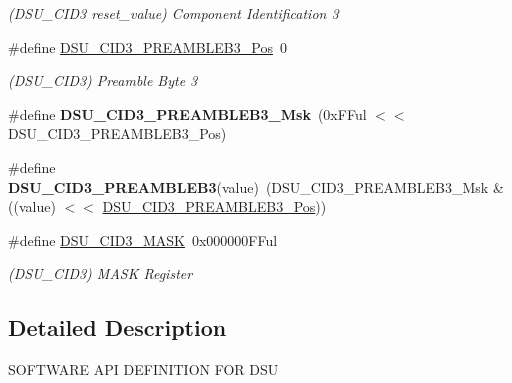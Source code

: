 \begin{DoxyCompactItemize}
\begin{DoxyCompactList}\small\item\em (D\+S\+U\+\_\+\+C\+I\+D3 reset\+\_\+value) Component Identification 3 \end{DoxyCompactList}\item 
\hypertarget{group___s_a_m_l21___d_s_u_gad11a14455b5f888c07616d9c56808b09}{}\#define \hyperlink{group___s_a_m_l21___d_s_u_gad11a14455b5f888c07616d9c56808b09}{D\+S\+U\+\_\+\+C\+I\+D3\+\_\+\+P\+R\+E\+A\+M\+B\+L\+E\+B3\+\_\+\+Pos}~0\label{group___s_a_m_l21___d_s_u_gad11a14455b5f888c07616d9c56808b09}

\begin{DoxyCompactList}\small\item\em (D\+S\+U\+\_\+\+C\+I\+D3) Preamble Byte 3 \end{DoxyCompactList}\item 
\hypertarget{group___s_a_m_l21___d_s_u_ga371986d5abba79b7e4389d750150cad1}{}\#define {\bfseries D\+S\+U\+\_\+\+C\+I\+D3\+\_\+\+P\+R\+E\+A\+M\+B\+L\+E\+B3\+\_\+\+Msk}~(0x\+F\+Ful $<$$<$ D\+S\+U\+\_\+\+C\+I\+D3\+\_\+\+P\+R\+E\+A\+M\+B\+L\+E\+B3\+\_\+\+Pos)\label{group___s_a_m_l21___d_s_u_ga371986d5abba79b7e4389d750150cad1}

\item 
\hypertarget{group___s_a_m_l21___d_s_u_gaa750f726cef165ba74dd6469057fa7d9}{}\#define {\bfseries D\+S\+U\+\_\+\+C\+I\+D3\+\_\+\+P\+R\+E\+A\+M\+B\+L\+E\+B3}(value)~(D\+S\+U\+\_\+\+C\+I\+D3\+\_\+\+P\+R\+E\+A\+M\+B\+L\+E\+B3\+\_\+\+Msk \& ((value) $<$$<$ \hyperlink{group___s_a_m_l21___d_s_u_gad11a14455b5f888c07616d9c56808b09}{D\+S\+U\+\_\+\+C\+I\+D3\+\_\+\+P\+R\+E\+A\+M\+B\+L\+E\+B3\+\_\+\+Pos}))\label{group___s_a_m_l21___d_s_u_gaa750f726cef165ba74dd6469057fa7d9}

\item 
\hypertarget{group___s_a_m_l21___d_s_u_ga7b551efb4b690585f91a21e36b24215f}{}\#define \hyperlink{group___s_a_m_l21___d_s_u_ga7b551efb4b690585f91a21e36b24215f}{D\+S\+U\+\_\+\+C\+I\+D3\+\_\+\+M\+A\+S\+K}~0x000000\+F\+Ful\label{group___s_a_m_l21___d_s_u_ga7b551efb4b690585f91a21e36b24215f}

\begin{DoxyCompactList}\small\item\em (D\+S\+U\+\_\+\+C\+I\+D3) M\+A\+S\+K Register \end{DoxyCompactList}\end{DoxyCompactItemize}


\subsection{Detailed Description}
S\+O\+F\+T\+W\+A\+R\+E A\+P\+I D\+E\+F\+I\+N\+I\+T\+I\+O\+N F\+O\+R D\+S\+U 